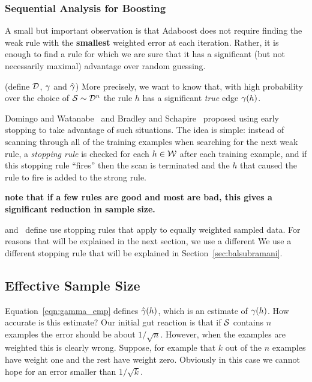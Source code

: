 \subsubsection{Sequential Analysis for Boosting}\label{sec:methods:early-stop}

A small but important observation is that Adaboost does not require
finding the weak rule with the {\bf smallest} weighted error at each
iteration. Rather, it is enough to find a rule for which we are sure
that it has a significant (but not necessarily maximal) advantage over
random guessing.

(define ${\cal D}$, $\gamma$ and $\hat{\gamma}$)
More precisely, we want to know that, with high
probability over the choice of ${\cal S} \sim {\cal D}^n$ the rule $h$
has a significant {\em true} edge $\gamma(h)$.

Domingo and Watanabe~\cite{domingo_scaling_2000} and Bradley and
Schapire~\cite{bradley_filterboost:_2007} proposed using early
stopping to take advantage of such situations. The idea is simple:
instead of scanning through all of the training examples when
searching for the next weak rule, a {\em stopping rule} is checked for
each $h \in \mathcal{W}$ after each training example, and if this stopping
rule ``fires'' then the scan is terminated and the $h$ that caused the
rule to fire is added to the strong rule.

{\bf note that if a few rules are good and most are bad, this gives a
  significant reduction in sample size.}

\cite{bradley_filterboost:_2007} and~\cite{domingo_scaling_2000}
define use stopping rules that apply to equally weighted sampled
data. For reasons that will be explained in the next section, we use a different
 We use a different stopping rule that will be explained in
 Section~\ref{sec:balsubramani}.


\subsection{Effective Sample Size}
\label{sec:effectiveSampleSize}
Equation~\ref{eqn:gamma_emp} defines $\hat{\gamma}(h)$, which is an
estimate of $\gamma(h)$. How accurate is this estimate? Our initial
gut reaction is that if ${\cal S}$ contains $n$ examples the error should be
about $1/\sqrt{n}$. However, when the examples are weighted this is
clearly wrong. Suppose, for example that $k$ out of the $n$ examples
have weight one and the rest have weight zero. Obviously in this case
we cannot hope for an error smaller than $1/\sqrt{k}$.


